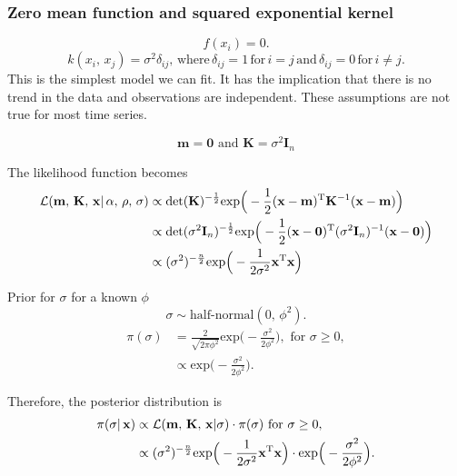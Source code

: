       \subsubsection{Zero mean function and squared exponential kernel}

         \[f(x_{i}) = 0.\]
         \[k(x_{i},\, x_{j}) = \sigma^2\delta_{ij}, \, \text{where} \, \delta_{ij} = 1 \, \text{for} \, i = j \, \text{and} \, \delta_{ij} = 0 \, \text{for} \, i \neq j.\]
         This is the simplest model we can fit. It has the implication that there is no trend in the data and observations are independent. These assumptions are not true for most time series.

         \[\mathbf{m} = \mathbf{0} \text{ and } \mathbf{K} = \sigma^2 \mathbf{I}_{n}\]

         The likelihood function becomes
         \begin{align*}
            \mathcal{L}(\mathbf{m} ,\, \mathbf{K} ,\, \mathbf{x}| \, \alpha ,\, \rho ,\, \sigma)
            & \propto \text{det}(\mathbf{K})^{-\frac{1}{2}} 
            \text{exp} \Big(-\frac{1}{2} (\mathbf{x} - \mathbf{m})^{\text{\text{T}}} \mathbf{K}^{-1} (\mathbf{x} - \mathbf{m}) \Big)\\
            & \propto \text{det}(\sigma^2 \mathbf{I}_{n})^{-\frac{1}{2}} 
            \text{exp} \Big(-\frac{1}{2} (\mathbf{x} - \mathbf{0})^{\text{\text{T}}} (\sigma^2 \mathbf{I}_{n})^{-1} (\mathbf{x} - \mathbf{0}) \Big)\\
            & \propto (\sigma^2)^{-\frac{n}{2}} \text{exp} \Big(-\frac{1}{2\sigma^2} \mathbf{x}^{\text{\text{T}}}\mathbf{x} \Big)
         \end{align*}

         Prior for \(\sigma\) for a known \(\phi\)
         \[\sigma \sim \text{half-normal} (0, \, \phi^2).\]
         \begin{align*}
            \pi(\sigma)
            & = \frac{2}{\sqrt{2\pi\phi^2}} \text{exp} \Big(-\frac{\sigma^2}{2\phi^2} \Big), \text{ for } \sigma \geq 0,\\
            & \propto \text{exp} \Big(-\frac{\sigma^2}{2\phi^2} \Big).
         \end{align*}

         Therefore, the posterior distribution is
         \begin{align*}
            \pi(\sigma| \, \mathbf{x}) 
            & \propto \mathcal{L}(\mathbf{m},\, \mathbf{K},\, \mathbf{x}| \sigma) 
            \cdot \pi(\sigma)
            \text{ for } \sigma \geq 0,\\
            & \propto (\sigma^2)^{-\frac{n}{2}} \text{exp} \Big(-\frac{1}{2\sigma^2} \mathbf{x}^{\text{\text{T}}}\mathbf{x} \Big)
            \cdot \text{exp} \Big(-\frac{\sigma^2}{2\phi^2} \Big).
         \end{align*}


